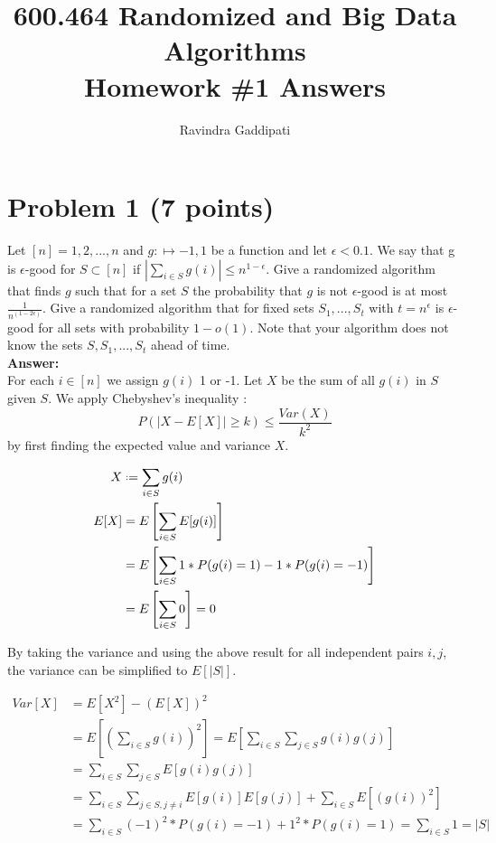\documentclass[letterpaper, 11pt]{article}
\newcommand*{\defeq}{\mathrel{\vcenter{\baselineskip0.5ex \lineskiplimit0pt
                     \hbox{\scriptsize.}\hbox{\scriptsize.}}}%
                     =}
\begin{document}
\title{600.464 Randomized and Big Data Algorithms \\ Homework \#1 Answers}
\author{Ravindra Gaddipati}


\maketitle
\pagebreak
\section*{Problem 1 (7 points)}
Let $[n] = {1,2,...,n}$ and $g: \mapsto {-1, 1}$ be a function and let $\epsilon < 0.1$. We say that g is $\epsilon$-good for $S \subset [n]$ if $|\sum_{i \in S} g(i)| \leq n^{1-\epsilon}$. Give a randomized algorithm that finds $g$ such that for a set $S$ the probability that $g$ is not $\epsilon$-good is at most $\frac{1}{n^(1-2\epsilon)}$. Give a randomized algorithm that for fixed sets $S_1,...,S_t$ with $t=n^\epsilon$ is $\epsilon$-good for all sets with probability $1-o(1)$. Note that your algorithm does not know the sets $S, S_1, ..., S_t$ ahead of time. \\
\textbf{Answer:} \\
For each $i \in [n]$ we assign $g(i)$ 1 or -1. Let $X$ be the sum of all $g(i)$ in $S$ given $S$. We apply Chebyshev's inequality :
$$P(|X-E[X]| \geq k) \leq \frac{Var(X)}{k^2}$$
by first finding the expected value and variance $X$.

\begin{align*}
X & \defeq \sum_{i \in S} g(i) \\
E[X] &= E \left[ \sum_{i \in S} E[g(i)] \right] \\
& = E\left[\sum_{i \in S} 1*P(g(i)=1) - 1 * P(g(i)=-1)\right] \\
& = E\left[\sum_{i \in S} 0\right] = 0 \\
\end{align*}

By taking the variance and using the above result for all independent pairs $i,j$, the variance can be simplified to $E[|S|]$.

\begin{align*}
Var[X] &= E[X^2] - (E[X])^2 \\
&= E\left[\left( \sum_{i \in S} g(i)\right)^2\right] = E\left[\sum_{i \in S}\sum_{j \in S} g(i)g(j)\right] \\
&= \sum_{i \in S}\sum_{j \in S} E[g(i)g(j)] \\
&= \sum_{i \in S}\sum_{j \in S, j\neq i} E[g(i)]E[g(j)] + \sum_{i \in S} E[(g(i))^2] \\ 
&= \sum_{i \in S} (-1)^2 * P(g(i) = -1) + 1^2 * P(g(i) = 1) = \sum_{i \in S} 1 = |S| \\
\end{align*}
\end{document}
